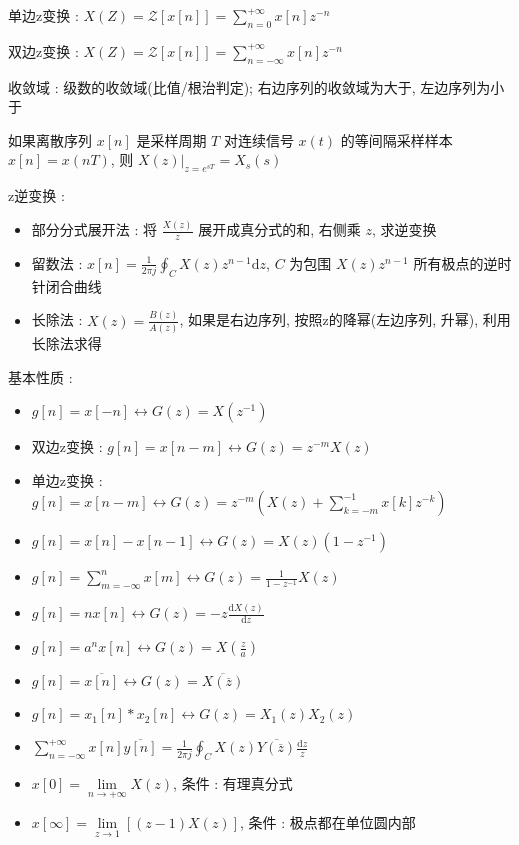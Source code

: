\documentclass[UTF8, 12pt]{ctexart}
\begin{document}
	单边z变换 : $ X(Z) = \mathscr{Z}[x[n]] = \sum\limits_{n=0}^{+\infty}x[n]z^{-n} $

	双边z变换 : $ X(Z) = \mathscr{Z}[x[n]] = \sum\limits_{n=-\infty}^{+\infty}x[n]z^{-n} $

	收敛域 : 级数的收敛域(比值/根治判定); 右边序列的收敛域为大于, 左边序列为小于

	如果离散序列 $ x[n] $ 是采样周期 $ T $ 对连续信号 $ x(t) $ 的等间隔采样样本 $ x[n] = x(nT) $, 则 $ X(z)|_{z=e^{sT}} = X_{s}(s) $

	z逆变换 :
	\begin{itemize}[leftmargin = 4em]
		\item 部分分式展开法 : 将 $ \frac{X(z)}{z} $ 展开成真分式的和, 右侧乘 $ z $, 求逆变换
		\item 留数法 : $ x[n] = \frac{1}{2\pi j} \oint_{C}X(z)z^{n-1}\mathrm{d}z $, $ C $ 为包围 $ X(z)z^{n-1} $ 所有极点的逆时针闭合曲线
		\item 长除法 : $ X(z) = \frac{B(z)}{A(z)} $, 如果是右边序列, 按照z的降幂(左边序列, 升幂), 利用长除法求得
	\end{itemize}

	基本性质 :
	\begin{itemize}[leftmargin = 4em]
		\item $ g[n] = x[-n] \leftrightarrow G(z) = X(z^{-1}) $
		\item 双边z变换 : $ g[n] = x[n-m] \leftrightarrow G(z) = z^{-m}X(z) $
		\item 单边z变换 : $ g[n] = x[n-m] \leftrightarrow G(z) = z^{-m}(X(z)+\sum\limits_{k=-m}^{-1}x[k]z^{-k}) $
		\item $ g[n] = x[n]-x[n-1] \leftrightarrow G(z) = X(z)(1-z^{-1}) $
		\item $ g[n] = \sum\limits_{m=-\infty}^{n}x[m] \leftrightarrow G(z) = \frac{1}{1-z^{-1}}X(z) $
		\item $ g[n] = nx[n] \leftrightarrow G(z) = -z\frac{\mathrm{d}X(z)}{\mathrm{d}z} $
		\item $ g[n] = a^{n}x[n] \leftrightarrow G(z) = X(\frac{z}{a}) $
		\item $ g[n] = \overline{x[n]} \leftrightarrow G(z) = \overline{X(\overline{z})} $
		\item $ g[n] = x_{1}[n]*x_{2}[n] \leftrightarrow G(z) = X_{1}(z)X_{2}(z) $
		\item $ \sum\limits_{n=-\infty}^{+\infty}x[n]\overline{y[n]} = \frac{1}{2\pi j} \oint_{C}X(z)\overline{Y(\overline{z})}\frac{\mathrm{d}z}{z} $
		\item $ x[0] = \lim\limits_{n \to +\infty} X(z) $, 条件 : 有理真分式
		\item $ x[\infty] = \lim\limits_{z \to 1}[(z-1)X(z)] $, 条件 : 极点都在单位圆内部
	\end{itemize}
\end{document}
